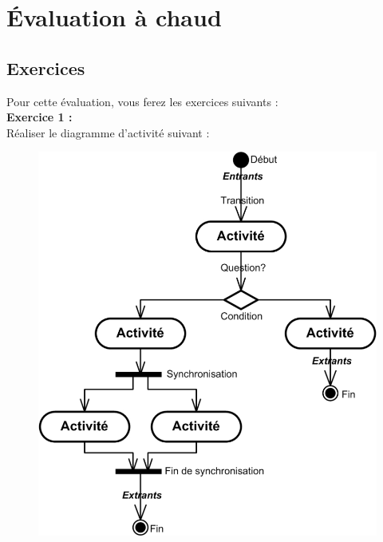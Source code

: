 \documentclass[asi, sansVersion]{picInsa}
\begin{document}
	\newpage
	\section*{Évaluation à chaud}
		\subsection*{Exercices}
		Pour cette évaluation, vous ferez les exercices suivants : 
		\\
		
		\textbf{Exercice 1 :}\\
		Réaliser le diagramme d'activité suivant : \\
		\begin{figure}[H]
			\centering
			\includegraphics[scale=0.5]{images/diagrammeDActivite.png}
		\end{figure}			
		
\end{document}
